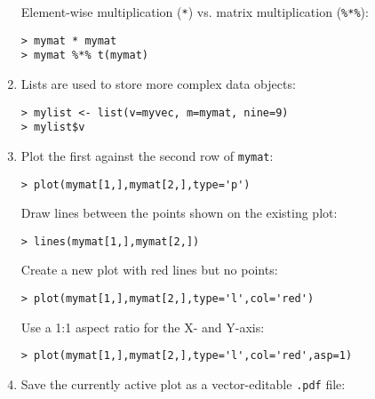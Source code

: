 \documentclass[11pt]{article}
\begin{document}
\begin{enumerate}
Element-wise multiplication (\verb|*|) vs. matrix multiplication
(\verb|%*%|):

\begin{verbatim}
> mymat * mymat
> mymat %*% t(mymat)
\end{verbatim}

\item Lists are used to store more complex data objects:

\begin{verbatim}
> mylist <- list(v=myvec, m=mymat, nine=9)
> mylist$v
\end{verbatim}

\item Plot the first against the second row of \texttt{mymat}:

\begin{verbatim}
> plot(mymat[1,],mymat[2,],type='p')
\end{verbatim}

Draw lines between the points shown on the existing plot:

\begin{verbatim}
> lines(mymat[1,],mymat[2,])
\end{verbatim}

Create a new plot with red lines but no points:

\begin{verbatim}
> plot(mymat[1,],mymat[2,],type='l',col='red')
\end{verbatim}

Use a 1:1 aspect ratio for the X- and Y-axis:

\begin{verbatim}
> plot(mymat[1,],mymat[2,],type='l',col='red',asp=1)
\end{verbatim}

\item Save the currently active plot as a vector-editable
  \texttt{.pdf} file:


\end{enumerate}
\end{document}

